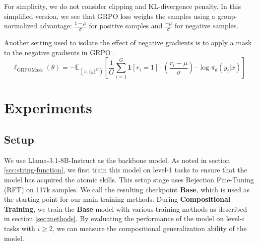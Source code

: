\documentclass[12pt]{cmuthesis}
\begin{document}
For simplicity, we do not consider clipping and KL-divergence penalty. In this simplified version, we see that GRPO loss weighs the samples using a group-normalized advantage: $\frac{1- \mu}{\sigma}$ for positive samples and $\frac{-\mu}{\sigma}$ for negative samples.


Another setting used to isolate the effect of negative gradients is to apply a mask to the negative gradients in GRPO \citep{setlurE3LearningExplore2025}.
\begin{equation}
    \ell_{\text{GRPOMask}}(\theta) = - \mathbb{E}_{(x, \{y\}^G)} \left[ \frac{1}{G} \sum_{i = 1}^G \boldsymbol{1}[r_i = 1] \cdot \left( \frac{r_i - \mu}{\sigma} \right) \cdot \log \pi_\theta(y_i \vert x) \right]
    \label{eq:GRPOMask}
\end{equation}





\chapter{Experiments}
\label{sec:experiments}
\section{Setup}
We use Llama-3.1-8B-Instruct as the backbone model. As noted in section \ref{sec:string-function}, we first train this model on level-1 tasks to ensure that the model has acquired the atomic skills. This setup stage uses Rejection Fine-Tuning (RFT) on 117k samples. We call the resulting checkpoint \textbf{Base}, which is used as the starting point for our main training methods.
During \textbf{Compositional Training}, we train the \textbf{Base} model with various training methods as described in section \ref{sec:methods}. By evaluating the performance of the model on level-$i$ tasks with $i \ge 2$, we can measure the compositional generalization ability of the model.
\end{document}
